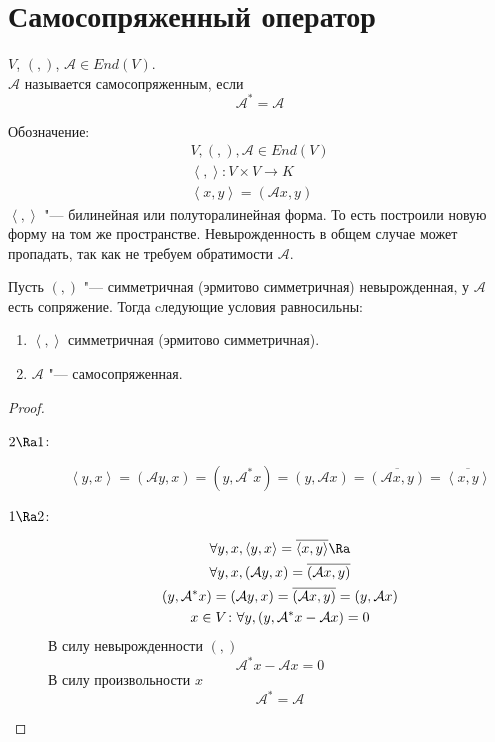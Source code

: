 \section{Самосопряженный оператор}

\begin{Def}
	$V$, $(,)$, $\mathcal A \in End(V)$.\\
	$\mathcal A $ называется самосопряженным, если
	\[ \mathcal A^* = \mathcal A \]
\end{Def}
Обозначение:
\begin{gather*}
	V, (,), \mathcal A \in End(V) \\
	\left<, \right>\colon V \times V \to K \\
	\left<x, y\right> = (\mathcal A x, y)
\end{gather*}
$\left<,\right>$ "--- билинейная или полуторалинейная форма. То есть построили новую форму на том же пространстве. 
Невырожденность в общем случае может пропадать, так как не требуем обратимости $\mathcal A$.

\begin{theorem}
	Пусть $(,)$ "--- симметричная (эрмитово симметричная) невырожденная, у $\mathcal A $ есть сопряжение.
	Тогда cледующие условия равносильны:
	\begin{enumerate}
		\item $\left<,\right>$  симметричная (эрмитово симметричная).
		\item $\mathcal A$  "--- самосопряженная.
	\end{enumerate}
\end{theorem}
\begin{proof}
	\begin{description}
	\item[$2 \Ra 1$:]
		\[
			\left<y, x\right> = (\mathcal A y, x) = (y, \mathcal A^*x)
			= (y, \mathcal A x) = \overline{(\mathcal A x, y)} = \overline{\left<x, y\right>}
		\]

	\item[$1 \Ra 2$:]
		\begin{gather*}
			\forall y, x, \left<y, x\right> = \overline{\left<x, y\right>} \Ra\\
			\forall y, x, (\mathcal A y, x) = \overline{(\mathcal A x, y)} \\
			(y, \mathcal A^*x) = (\mathcal A y, x) = \overline{(\mathcal A x, y)} = (y, \mathcal A x) \\
			x \in V \colon \forall y, (y, \mathcal A^*x - \mathcal A x) = 0
		\end{gather*}
		В силу невырожденности $(,)$
		\[ \mathcal A^*x - \mathcal A x = 0 \]
		В силу произвольности $x$
		\[ \mathcal A^* = \mathcal A \]
	\end{description}
\end{proof}


